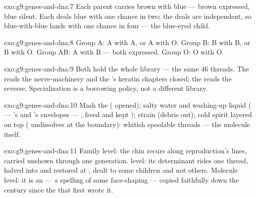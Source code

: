 \begin{solution}{exo:g9:genes-and-dna:7}
Each parent carries brown with blue --- brown expressed,
blue silent. Each deals blue with one chance in two; the
deals are independent, so blue-with-blue lands with one
chance in four --- the blue-eyed child.
\end{solution}

\begin{solution}{exo:g9:genes-and-dna:8}
Group A: A with A, or A with O. Group B: B with B, or B
with O. Group AB: A with B --- both expressed. Group O: O
with O.
\end{solution}

\begin{solution}{exo:g9:genes-and-dna:9}
Both hold the whole library --- the same 46 threads. The
 reads the nerve-machinery  and  the
's keratin chapters closed; the   reads the
reverse. Specialization is a borrowing policy, not a
different library.
\end{solution}

\begin{solution}{exo:g9:genes-and-dna:10}
Mash the  ( opened); salty water and washing-up
liquid ( --- 's and 's envelopes ---
,  freed and kept ); strain (debris
out); cold spirit layered on top ( undissolves at the
boundary): whitish spoolable threads --- the molecule
itself.
\end{solution}

\begin{solution}{exo:g9:genes-and-dna:11}
Family level: the chin recurs along reproduction's lines,
carried unshown through one generation.  level:
its determinant rides one thread, halved into  and
restored at , dealt to some children and not
others. Molecule level: it is an  --- a spelling of
some face-shaping  --- copied faithfully down the
century since the  that first wrote it.
\end{solution}

